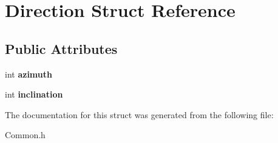 \hypertarget{struct_direction}{\section{Direction Struct Reference}
\label{struct_direction}
}
\subsection*{Public Attributes}
\begin{DoxyCompactItemize}
\item 
\hypertarget{struct_direction_ac66e4839c31ca520fdc090131dfabb07}{int {\bfseries azimuth}}\label{struct_direction_ac66e4839c31ca520fdc090131dfabb07}

\item 
\hypertarget{struct_direction_ae15d3df8c3c59bb0acc7a4ed97f7cdc4}{int {\bfseries inclination}}\label{struct_direction_ae15d3df8c3c59bb0acc7a4ed97f7cdc4}

\end{DoxyCompactItemize}


The documentation for this struct was generated from the following file\+:\begin{DoxyCompactItemize}
\item 
Common.\+h\end{DoxyCompactItemize}
